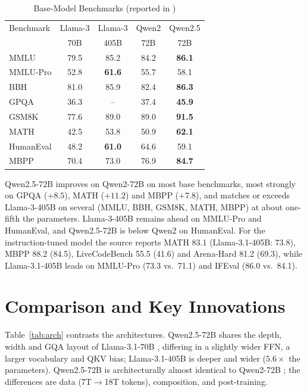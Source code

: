 \documentclass[conference]{IEEEtran}
\begin{document}
\begin{table}[!tb]
\caption{Base-Model Benchmarks (reported in \cite{qwen25blog})}
\label{tab:base}
\centering\footnotesize
\setlength{\tabcolsep}{3.2pt}
\begin{tabular}{@{}lcccc@{}}
\toprule
Benchmark & Llama-3 & Llama-3 & Qwen2 & Qwen2.5 \\
 & 70B & 405B & 72B & 72B \\
\midrule
MMLU & 79.5 & 85.2 & 84.2 & \textbf{86.1} \\
MMLU-Pro & 52.8 & \textbf{61.6} & 55.7 & 58.1 \\
BBH & 81.0 & 85.9 & 82.4 & \textbf{86.3} \\
GPQA & 36.3 & -- & 37.4 & \textbf{45.9} \\
GSM8K & 77.6 & 89.0 & 89.0 & \textbf{91.5} \\
MATH & 42.5 & 53.8 & 50.9 & \textbf{62.1} \\
HumanEval & 48.2 & \textbf{61.0} & 64.6 & 59.1 \\
MBPP & 70.4 & 73.0 & 76.9 & \textbf{84.7} \\
\bottomrule
\end{tabular}
\end{table}

Qwen2.5-72B improves on Qwen2-72B on most base benchmarks, most strongly on GPQA ($+8.5$), MATH ($+11.2$) and MBPP ($+7.8$), and matches or exceeds Llama-3-405B on several (MMLU, BBH, GSM8K, MATH, MBPP) at about one-fifth the parameters. Llama-3-405B remains ahead on MMLU-Pro and HumanEval, and Qwen2.5-72B is below Qwen2 on HumanEval. For the instruction-tuned model the source reports MATH 83.1 (Llama-3.1-405B: 73.8), MBPP 88.2 (84.5), LiveCodeBench 55.5 (41.6) and Arena-Hard 81.2 (69.3), while Llama-3.1-405B leads on MMLU-Pro (73.3 vs.\ 71.1) and IFEval (86.0 vs.\ 84.1).

\section{Comparison and Key Innovations}
Table~\ref{tab:arch} contrasts the architectures. Qwen2.5-72B shares the depth, width and GQA layout of Llama-3.1-70B \cite{llama3}, differing in a slightly wider FFN, a larger vocabulary and QKV bias; Llama-3.1-405B is deeper and wider ($5.6\times$ the parameters). Qwen2.5-72B is architecturally almost identical to Qwen2-72B \cite{qwen2}; the differences are data (7T$\rightarrow$18T tokens), composition, and post-training.
\end{document}
